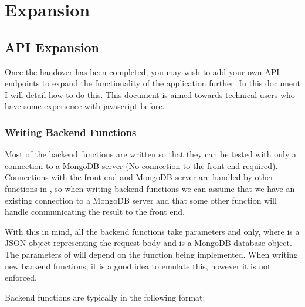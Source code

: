 \documentclass[letterpaper,10pt,english]{sphinxmanual}
\let\oldsubsection\subsection
\renewcommand{\subsection}{\needspace{6\baselineskip}\oldsubsection}
\begin{document}
\chapter{Expansion}
\label{\detokenize{index:expansion}}

\section{API Expansion}
\label{\detokenize{docs/Expansion/api-expansion:api-expansion}}\label{\detokenize{docs/Expansion/api-expansion::doc}}
Once the handover has been completed, you may wish to add your own API
endpoints to expand the functionality of the application further. In
this document I will detail how to do this. This document is aimed
towards technical users who have some experience with javascript before.


\subsection{Writing Back\sphinxhyphen{}end Functions}
\label{\detokenize{docs/Expansion/api-expansion:writing-back-end-functions}}
Most of the back\sphinxhyphen{}end functions are written so that they can be tested
with only a connection to a MongoDB server (No connection to the front
end required). Connections with the front end and MongoDB server are
handled by other functions in , so when writing
back\sphinxhyphen{}end functions we can assume that we have an existing connection to
a MongoDB server and that some other function will handle communicating
the result to the front end.

With this in mind, all the back\sphinxhyphen{}end functions take parameters 
and  only, where  is a JSON object representing the
request body and  is a MongoDB database object. The parameters of
 will depend on the function being implemented. When writing new
back\sphinxhyphen{}end functions, it is a good idea to emulate this, however it is not
enforced.

Back\sphinxhyphen{}end functions are typically in the following format:
\end{document}
